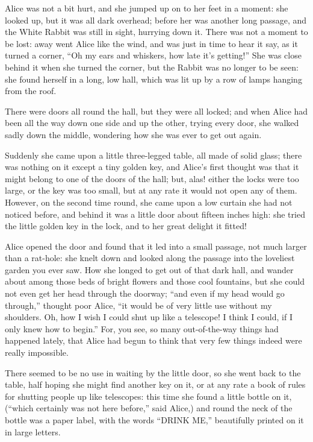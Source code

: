 \documentclass[11pt,openany,oneside]{book}
\begin{document}
Alice was not a bit hurt, and she jumped up on to her feet in a moment: she looked up, but it was all dark overhead; before her was another long passage, and the White Rabbit was still in sight, hurrying down it. There was not a moment to be lost: away went Alice like the wind, and was just in time to hear it say, as it turned a corner, “Oh my ears and whiskers, how late it’s getting!” She was close behind it when she turned the corner, but the Rabbit was no longer to be seen: she found herself in a long, low hall, which was lit up by a row of lamps hanging from the roof. 

There were doors all round the hall, but they were all locked; and when Alice had been all the way down one side and up the other, trying every door, she walked sadly down the middle, wondering how she was ever to get out again. 

Suddenly she came upon a little three-legged table, all made of solid glass; there was nothing on it except a tiny golden key, and Alice’s first thought was that it might belong to one of the doors of the hall; but, alas! either the locks were too large, or the key was too small, but at any rate it would not open any of them. However, on the second time round, she came upon a low curtain she had not noticed before, and behind it was a little door about fifteen inches high: she tried the little golden key in the lock, and to her great delight it fitted! 

Alice opened the door and found that it led into a small passage, not much larger than a rat-hole: she knelt down and looked along the passage into the loveliest garden you ever saw. How she longed to get out of that dark hall, and wander about among those beds of bright flowers and those cool fountains, but she could not even get her head through the doorway; “and even if my head would go through,” thought poor Alice, “it would be of very little use without my shoulders. Oh, how I wish I could shut up like a telescope! I think I could, if I only knew how to begin.” For, you see, so many out-of-the-way things had happened lately, that Alice had begun to think that very few things indeed were really impossible. 

There seemed to be no use in waiting by the little door, so she went back to the table, half hoping she might find another key on it, or at any rate a book of rules for shutting people up like telescopes: this time she found a little bottle on it, (“which certainly was not here before,” said Alice,) and round the neck of the bottle was a paper label, with the words “DRINK ME,” beautifully printed on it in large letters. 
\end{document}
